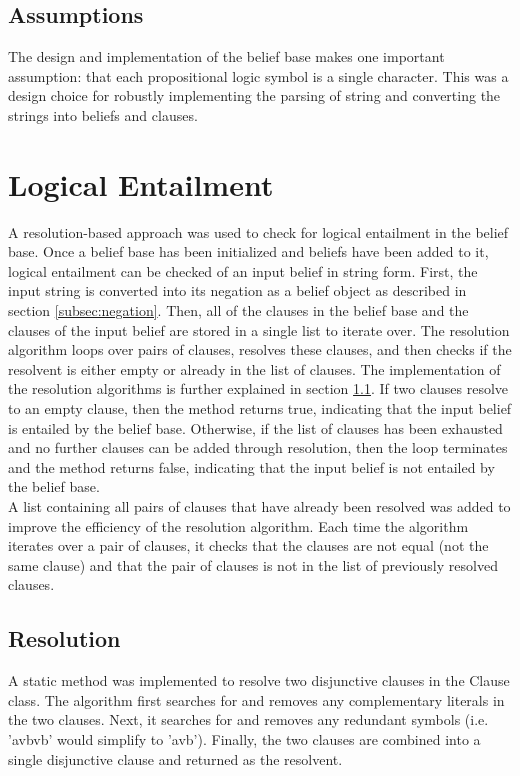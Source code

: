 \documentclass[a4paper,10pt]{article}
\begin{document}
\subsection{Assumptions}
\label{subsec:assumptions}
The design and implementation of the belief base makes one important assumption: that each propositional logic symbol is a single character. This was a
design choice for robustly implementing the parsing of string and converting the strings into beliefs and clauses.

\section{Logical Entailment}
\label{sec:entail}
A resolution-based approach was used to check for logical entailment in the belief base. Once a belief base has been initialized and beliefs have been added
to it, logical entailment can be checked of an input belief in string form. First, the input string is converted into its negation as a belief object as described
in section \ref{subsec:negation}. Then, all of the clauses in the belief base and the clauses of the input belief are stored in a single list to iterate over. The
resolution algorithm loops over pairs of clauses, resolves these clauses, and then checks if the resolvent is either empty or already in the list of clauses.
The implementation of the resolution algorithms is further explained in section \ref{subsec:resolution}. If two clauses resolve to an empty clause,
then the method returns true, indicating that the input belief is entailed by the belief base. Otherwise, if the list of clauses has been exhausted and no further
clauses can be added through resolution, then the loop terminates and the method returns false, indicating that the input belief is not entailed by the belief
base. \\

A list containing all pairs of clauses that have already been resolved was added to improve the efficiency of the resolution algorithm. Each time the algorithm
iterates over a pair of clauses, it checks that the clauses are not equal (not the same clause) and that the pair of clauses is not in the list of previously
resolved clauses. \\

\subsection{Resolution}
\label{subsec:resolution}
A static method was implemented to resolve two disjunctive clauses in the Clause class. The algorithm first searches for and removes any complementary literals
in the two clauses. Next, it searches for and removes any redundant symbols (i.e. 'avbvb' would simplify to 'avb'). Finally, the two clauses are combined into
a single disjunctive clause and returned as the resolvent.
\end{document}
